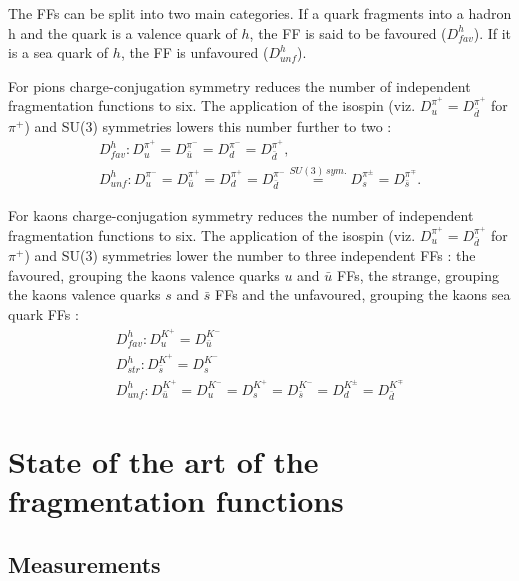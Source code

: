 The FFs can be split into two main categories. If a quark fragments into a hadron h and the quark is a valence quark of $h$, the FF is said to be favoured ($D^h_{fav}$). If it is a sea quark of $h$, the FF is unfavoured ($D^h_{unf}$).

For pions charge-conjugation symmetry reduces the number of independent fragmentation functions to six. The application of the isospin (viz. $D^{\pi^+}_u = D^{\pi^+}_{\bar{d}}$ for $\pi^+$) and SU($3$) symmetries lowers this number further to two :
%
\begin{equation}
  \begin{split}
    D^h_{fav} : D^{\pi^+}_u = D^{\pi^-}_{\bar{u}} = D^{\pi^-}_d = D^{\pi^+}_{\bar{d}}, \\
    D^h_{unf} : D^{\pi^-}_u = D^{\pi^+}_{\bar{u}} = D^{\pi^+}_d = D^{\pi^-}_{\bar{d}} \stackrel{SU(3)\,sym.}{=} D^{\pi^{\pm}}_s = D^{\pi^{\mp}}_{\bar{s}}.
  \end{split}
\end{equation}

For kaons charge-conjugation symmetry reduces the number of independent fragmentation functions to six. The application of the isospin (viz. $D^{\pi^+}_u = D^{\pi^+}_{\bar{d}}$ for $\pi^+$) and SU($3$) symmetries lower the number to three independent FFs : the favoured, grouping the kaons valence quarks $u$ and $\bar{u}$ FFs, the strange, grouping the kaons valence quarks $s$ and $\bar{s}$ FFs and the unfavoured, grouping the kaons sea quark FFs :
%
\begin{equation}
  \begin{split}
    D^h_{fav} : D^{K^+}_u = D^{K^-}_{\bar{u}} \\
    D^h_{str} : D^{K^+}_{\bar{s}} = D^{K^-}_{s} \\
    D^h_{unf} : D^{K^+}_{\bar{u}} = D^{K^-}_{u} = D^{K^+}_s = D^{K^-}_{\bar{s}} = D^{K^{\pm}}_{d} = D^{K^{\mp}}_{\bar{d}}
  \end{split}
\end{equation}


\section{State of the art of the fragmentation functions}

\subsection{Measurements}

